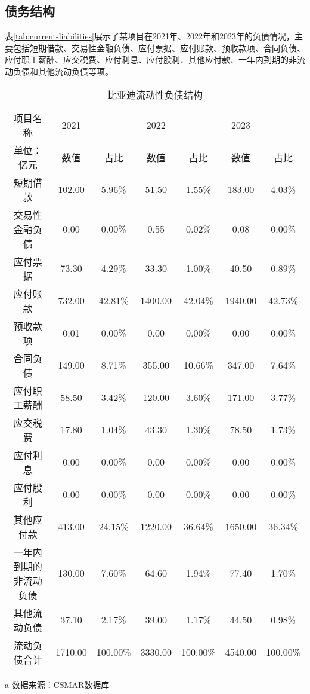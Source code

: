 \subsection{债务结构}
表\eqref{tab:current-liabilities}展示了某项目在2021年、2022年和2023年的负债情况，主要包括短期借款、交易性金融负债、应付票据、应付账款、预收款项、合同负债、应付职工薪酬、应交税费、应付利息、应付股利、其他应付款、一年内到期的非流动负债和其他流动负债等项。
\begin{table}
  \centering
  \begin{threeparttable}[c]
    \caption{比亚迪流动性负债结构}
    \label{tab:current-liabilities}
    \begin{tabular}{ccccccc}
      \toprule
      项目名称 & 2021 & ~ & 2022 & ~ & 2023 & ~ \\ 
        单位：亿元 & 数值 & 占比 & 数值 & 占比 & 数值 & 占比 \\ 
      \midrule
        短期借款 & 102.00  & 5.96\% & 51.50  & 1.55\% & 183.00  & 4.03\% \\ 
        交易性金融负债 & 0.00  & 0.00\% & 0.55  & 0.02\% & 0.08  & 0.00\% \\ 
        应付票据 & 73.30  & 4.29\% & 33.30  & 1.00\% & 40.50  & 0.89\% \\ 
        应付账款 & 732.00  & 42.81\% & 1400.00  & 42.04\% & 1940.00  & 42.73\% \\ 
        预收款项 & 0.01  & 0.00\% & 0.00  & 0.00\% & 0.00  & 0.00\% \\ 
        合同负债 & 149.00  & 8.71\% & 355.00  & 10.66\% & 347.00  & 7.64\% \\ 
        应付职工薪酬 & 58.50  & 3.42\% & 120.00  & 3.60\% & 171.00  & 3.77\% \\ 
        应交税费 & 17.80  & 1.04\% & 43.30  & 1.30\% & 78.50  & 1.73\% \\ 
        应付利息 & 0.00  & 0.00\% & 0.00  & 0.00\% & 0.00  & 0.00\% \\ 
        应付股利 & 0.00  & 0.00\% & 0.00  & 0.00\% & 0.00  & 0.00\% \\ 
        其他应付款 & 413.00  & 24.15\% & 1220.00  & 36.64\% & 1650.00  & 36.34\% \\ 
        一年内到期的非流动负债 & 130.00  & 7.60\% & 64.60  & 1.94\% & 77.40  & 1.70\% \\ 
        其他流动负债 & 37.10  & 2.17\% & 39.00  & 1.17\% & 44.50  & 0.98\% \\ 
        流动负债合计 & 1710.00  & 100.00\% & 3330.00  & 100.00\% & 4540.00  & 100.00\% \\ 
      \bottomrule
    \end{tabular}
    \begin{tablenotes}
      \item [a] 数据来源：CSMAR数据库
    \end{tablenotes}
  \end{threeparttable}
\end{table}

